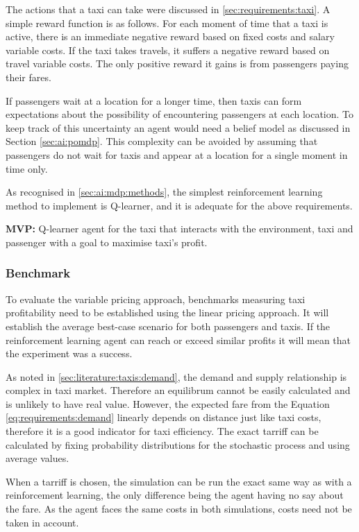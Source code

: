 The actions that a taxi can take were discussed in \ref{sec:requirements:taxi}.
A simple reward function is as follows. For each moment of time that a taxi is
active, there is an immediate negative reward based on fixed costs and salary
variable costs. If the taxi takes travels, it suffers a negative reward based
on travel variable costs. The only positive reward it gains is from passengers
paying their fares.

If passengers wait at a location for a longer time, then taxis can form
expectations about the possibility of encountering passengers at each location.
To keep track of this uncertainty an agent would need a belief model as
discussed in Section \ref{sec:ai:pomdp}. This complexity can be avoided by
assuming that passengers do not wait for taxis and appear at a location for a
single moment in time only.

As recognised in \ref{sec:ai:mdp:methods}, the simplest reinforcement learning
method to implement is Q-learner, and it is adequate for the above
requirements.

\textbf{MVP:} Q-learner agent for the taxi that interacts with the environment,
taxi and passenger with a goal to maximise taxi's profit.


\subsubsection{Benchmark} 

To evaluate the variable pricing approach, benchmarks measuring taxi
profitability need to be established using the linear pricing approach. It will
establish the average best-case scenario for both passengers and taxis. If the
reinforcement learning agent can reach or exceed similar profits it will mean
that the experiment was a success.

As noted in \ref{sec:literature:taxis:demand}, the demand and supply
relationship is complex in taxi market. Therefore an equilibrum cannot be
easily calculated and is unlikely to have real value. However, the expected
fare from the Equation \ref{eq:requirements:demand} linearly depends on
distance just like taxi costs, therefore it is a good indicator for taxi
efficiency. The exact tarriff can be calculated by fixing probability
distributions for the stochastic process and using average values.

When a tarriff is chosen, the simulation can be run the exact same way as with
a reinforcement learning, the only difference being the agent having no say
about the fare. As the agent faces the same costs in both simulations, costs
need not be taken in account.

